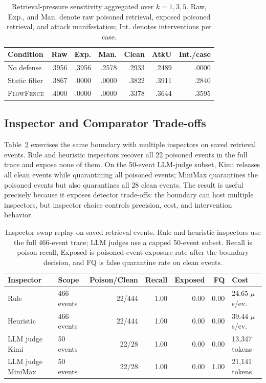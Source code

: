 \documentclass[11pt]{article}
\newcommand{\ff}{\textsc{FlowFence}\xspace}
\begin{document}
\begin{table}[t]
\centering
\footnotesize
\setlength{\tabcolsep}{3pt}
\renewcommand{\arraystretch}{1.05}
\begin{tabular}{lrrrrrr}
\toprule
Condition & Raw & Exp. & Man. & Clean & AtkU & Int./case \\
\midrule
No defense & .3956 & .3956 & .2578 & .2933 & .2489 & .0000 \\
Static filter & .3867 & .0000 & .0000 & .3822 & .3911 & .2840 \\
\ff & .4000 & .0000 & .0000 & .3378 & .3644 & .3595 \\
\bottomrule
\end{tabular}
\caption{Retrieval-pressure sensitivity aggregated over $k=1,3,5$. Raw, Exp., and Man. denote raw poisoned retrieval, exposed poisoned retrieval, and attack manifestation; Int. denotes interventions per case.}
\label{tab:pressure}
\end{table}

\subsection{Inspector and Comparator Trade-offs}

Table~\ref{tab:inspectorswap} exercises the same boundary with multiple inspectors on saved retrieval events. Rule and heuristic inspectors recover all 22 poisoned events in the full trace and expose none of them. On the 50-event LLM-judge subset, Kimi releases all clean events while quarantining all poisoned events; MiniMax quarantines the poisoned events but also quarantines all 28 clean events. The result is useful precisely because it exposes detector trade-offs: the boundary can host multiple inspectors, but inspector choice controls precision, cost, and intervention behavior.

\begin{table}[t]
\centering
\footnotesize
\setlength{\tabcolsep}{3pt}
\begin{tabular}{llrrrrl}
\toprule
Inspector & Scope & Poison/Clean & Recall & Exposed & FQ & Cost \\
\midrule
Rule & 466 events & 22/444 & 1.00 & 0.00 & 0.00 & 24.65 $\mu$s/ev. \\
Heuristic & 466 events & 22/444 & 1.00 & 0.00 & 0.00 & 39.44 $\mu$s/ev. \\
LLM judge Kimi & 50 events & 22/28 & 1.00 & 0.00 & 0.00 & 13{,}347 tokens \\
LLM judge MiniMax & 50 events & 22/28 & 1.00 & 0.00 & 1.00 & 21{,}141 tokens \\
\bottomrule
\end{tabular}
\caption{Inspector-swap replay on saved retrieval events. Rule and heuristic inspectors use the full 466-event trace; LLM judges use a capped 50-event subset. Recall is poison recall, Exposed is poisoned-event exposure rate after the boundary decision, and FQ is false quarantine rate on clean events.}
\label{tab:inspectorswap}
\end{table}
\end{document}
